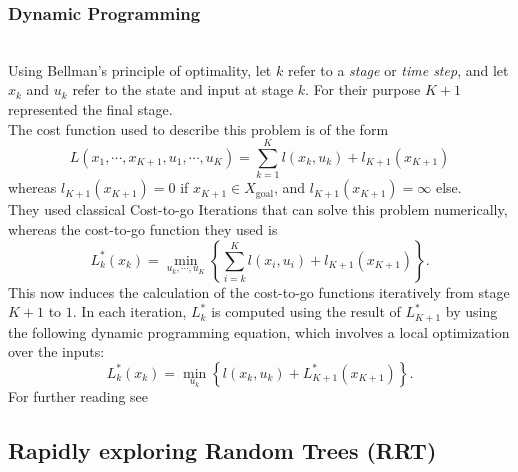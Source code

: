 \documentclass[conference]{IEEEtran}
\begin{document}
\subsubsection{Dynamic Programming}
\quad \\
Using Bellman's principle of optimality, let $k$ refer to a \textit{stage} or \textit{time step}, and let $x_k$ and $u_k$ refer to the state and input at stage $k$. For their purpose $K+1$ represented the final stage.\\
The cost function used to describe this problem is of the form
\begin{equation}
L(x_1,\cdots,x_{K+1}, u_1,\cdots,u_K) = \sum_{k=1}^K l(x_k,u_k) + l_{K+1}(x_{K+1})
\end{equation}
whereas $l_{K+1}(x_{K+1})=0$ if $x_{K+1} \in X_\text{goal}$, and $l_{K+1}(x_{K+1})=\infty$ else.\\
They used classical Cost-to-go Iterations that can solve this problem numerically, whereas the cost-to-go function they used is 
\begin{equation}
L_k^*(x_k) = \min_{u_k,\cdots,u_K} \left\{ \sum_{i=k}^K l(x_i,u_i)+l_{K+1}(x_{K+1})\right\}.
\end{equation}
This now induces the calculation of the cost-to-go functions iteratively from stage $K+1$ to $1$. In each iteration, $L_k^*$ is computed using the result of $L_{K+1}^*$ by using the following dynamic programming equation, which involves a local optimization over the inputs:
\begin{equation}
L_k^*(x_k) = \min_{u_k} \left\{l(x_k,u_k) + L_{K+1}^*(x_{K+1})\right\}.
\end{equation}
For further reading see \cite{LaValle.}

\subsection{Rapidly exploring Random Trees (RRT)}
\end{document}
